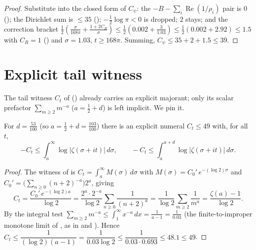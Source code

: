 \begin{proof}
\leanok
Substitute into the closed form of $C_\psi$: the $-B-\sum_i\operatorname{Re}(1/\rho_i)$
pair is $0$ (); the Dirichlet sum is $\le35$
(); $-\tfrac12\log\pi<0$ is dropped; $2$ stays; and the
correction bracket $\tfrac12(\tfrac{\sigma}{168\pi}+\tfrac{1+2C_R}{\sigma})
\le\tfrac12(0.002+\tfrac{3}{1.03})\le\tfrac12(0.002+2.92)\le1.5$ with $C_R=1$
() and $\sigma=1.03$, $t\ge168\pi$. Summing,
$C_\psi\le35+2+1.5\le 39$.
\end{proof}

\section{Explicit tail witness}
\label{sec:le_tail}

The tail witness $C_t$ of 
() already carries an explicit majorant;
only its scalar prefactor $\sum_{m\ge2}m^{-a}$ ($a=\tfrac12+d$) is left implicit. We pin it.

\begin{lemma}
\label{lem:le_tail_explicit}
\leanok
{}
For $d=\tfrac{53}{100}$ (so $a=\tfrac12+d=\tfrac{103}{100}$) there is an explicit numeral
$C_t\le 49$ with, for all $t$,
\[
  -C_t\le\int_{a}^{\infty}\log|\zeta(\sigma+it)|\,d\sigma,
  \qquad
  -C_t\le\int_{a}^{a+d}\log|\zeta(\sigma+it)|\,d\sigma .
\]
\end{lemma}

\begin{proof}
\leanok
The witness of  is
$C_t=\int_a^\infty M(\sigma)\,d\sigma$ with $M(\sigma)=C_0'\,e^{-(\log2)\sigma}$ and
$C_0'=\bigl(\sum_{n\ge0}(n+2)^{-a}\bigr)2^{a}$, giving
\[
  C_t=\frac{C_0'\,e^{-(\log2)a}}{\log2}
     =\frac{2^{a}\cdot 2^{-a}}{\log2}\sum_{n\ge0}\frac1{(n+2)^{a}}
     =\frac1{\log2}\sum_{m\ge2}\frac1{m^{a}}
     =\frac{\zeta(a)-1}{\log2}.
\]
By the integral test $\sum_{m\ge2}m^{-a}\le\int_1^\infty x^{-a}\,dx=\tfrac1{a-1}=\tfrac1{0.03}$
(the finite-to-improper monotone limit of , as in
 and ). Hence
$C_t\le\dfrac1{(\log2)(a-1)}=\dfrac1{0.03\log2}\le\dfrac1{0.03\cdot0.693}\le 48.1\le 49$.
\end{proof}

